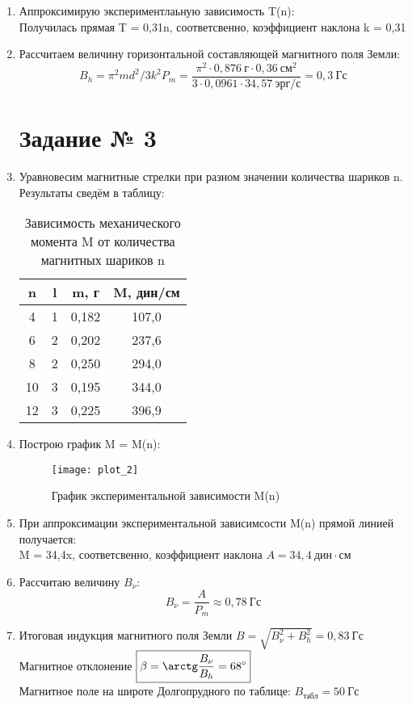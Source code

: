 \begin{enumerate}
\item Аппроксимирую  экспериментлаьную зависимость T(n): \\
Получилась прямая T = 0,31n, соответсвенно, коэффициент наклона k = 0,31 \\
\item Рассчитаем величину горизонтальной составляющей магнитного поля Земли: \\
\[
B_h = \pi^2 m d^2 / 3 k^2 P_m = \frac{\pi^2 \cdot 0,876 \ г \cdot 0,36 \ см^2}{3 \cdot  0,0961 \cdot  34,57 \ эрг/с} =  0,3 \ Гс
\]

\section*{Задание № 3}
\item Уравновесим магнитные стрелки при разном значении количества шариков n. Результаты сведём в таблицу: \\

\begin{table}[!h]
	\centering
	\begin{tabular}{|c|c|c|c|}
		\hline
		n  & l & m, г  & M, дин/см \\ \hline
		4  & 1 & 0,182 & 107,0     \\ \hline
		6  & 2 & 0,202 & 237,6     \\ \hline
		8  & 2 & 0,250 & 294,0     \\ \hline
		10 & 3 & 0,195 & 344,0     \\ \hline
		12 & 3 & 0,225 & 396,9     \\ \hline
	\end{tabular}
	\caption{Зависимость механического момента M от количества магнитных шариков n}
	\label{tab:table_2}
\end{table}

\item Построю график M = M(n):\\

\begin{figure}[h!]
	\centering
	\texttt{[image: plot\_2]}
	\caption{График экспериментальной зависимости M(n)}
	\label{fig:plot_2}
\end{figure}

\item При аппроксимации экспериментальной зависимсости M(n) прямой линией \\ получается:\\
M = 34,4x, соответсвенно, коэффициент наклона $A = 34,4 \ дин \cdot см$  \\
\item Рассчитаю величину $B_{\nu}$: \\
\[
B_{\nu} = \frac{A}{P_m} \approx 0,78 \ Гс
\]
\item Итоговая индукция магнитного поля Земли $\boxed{B = \sqrt{B_{\nu}^2 + B_h^2} = 0,83 \ Гс}$ \\
Магнитное отклонение $\boxed{\beta = \arctg \frac{B_{\nu}}{B_h} = 68^{\circ}}$ \\
Магнитное поле на широте Долгопрудного по таблице: $\boxed{B_{табл} = 50 \ Гс}$

\end{enumerate}

